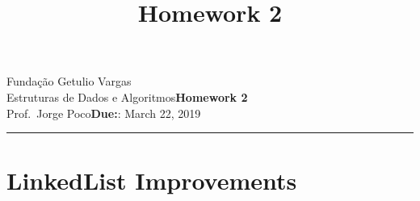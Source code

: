 \documentclass{article}
\title{Homework 2}
\date{}
\newcommand{\assignment}{Homework 2}
\newcommand{\duedate}{March 22, 2019}
\begin{document}
Fundação Getulio Vargas\hfill\\
Estruturas de Dados e Algoritmos\hfill\textbf{\assignment}\\
Prof.\ Jorge Poco\hfill\textbf{Due:}: \duedate\\
\smallskip\hrule\bigskip

{\let\newpage\relax\maketitle}
\maketitle


\section{LinkedList Improvements }
\end{document}
